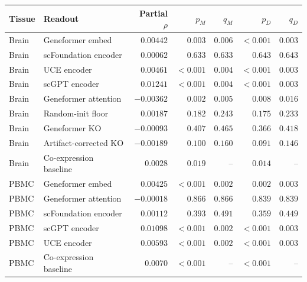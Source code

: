 \begin{tabular}{llrrrrr}
\toprule
Tissue & Readout & Partial $\rho$ & $p_M$ & $q_M$ & $p_D$ & $q_D$ \\ 
\midrule
Brain & Geneformer embed & $0.00442$ & $0.003$ & $0.006$ & $<0.001$ & $0.003$ \\
Brain & scFoundation encoder & $0.00062$ & $0.633$ & $0.633$ & $0.643$ & $0.643$ \\
Brain & UCE encoder & $0.00461$ & $<0.001$ & $0.004$ & $<0.001$ & $0.003$ \\
Brain & scGPT encoder & $0.01241$ & $<0.001$ & $0.004$ & $<0.001$ & $0.003$ \\
Brain & Geneformer attention & $-0.00362$ & $0.002$ & $0.005$ & $0.008$ & $0.016$ \\
Brain & Random-init floor & $0.00187$ & $0.182$ & $0.243$ & $0.175$ & $0.233$ \\
Brain & Geneformer KO & $-0.00093$ & $0.407$ & $0.465$ & $0.366$ & $0.418$ \\
Brain & Artifact-corrected KO & $-0.00189$ & $0.100$ & $0.160$ & $0.091$ & $0.146$ \\
Brain & Co-expression baseline & $0.0028$ & $0.019$ & -- & $0.014$ & -- \\
PBMC & Geneformer embed & $0.00425$ & $<0.001$ & $0.002$ & $0.002$ & $0.003$ \\
PBMC & Geneformer attention & $-0.00018$ & $0.866$ & $0.866$ & $0.839$ & $0.839$ \\
PBMC & scFoundation encoder & $0.00112$ & $0.393$ & $0.491$ & $0.359$ & $0.449$ \\
PBMC & scGPT encoder & $0.01098$ & $<0.001$ & $0.002$ & $<0.001$ & $0.003$ \\
PBMC & UCE encoder & $0.00593$ & $<0.001$ & $0.002$ & $<0.001$ & $0.003$ \\
PBMC & Co-expression baseline & $0.0070$ & $<0.001$ & -- & $<0.001$ & -- \\
\bottomrule
\end{tabular}
